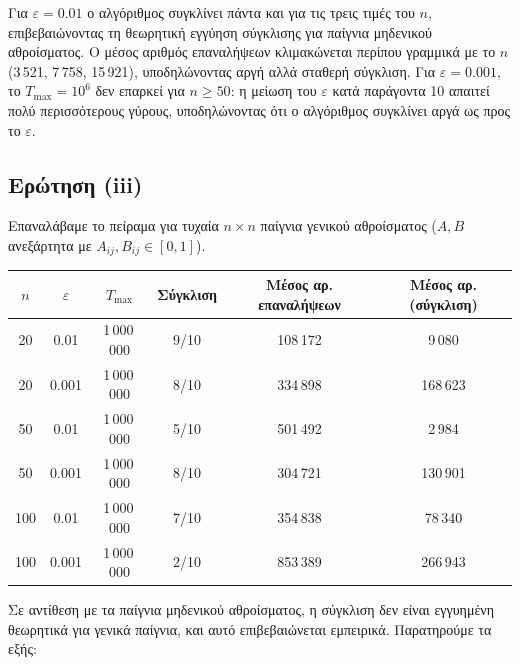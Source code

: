 Για $\varepsilon = 0.01$ ο αλγόριθμος συγκλίνει πάντα και για τις τρεις τιμές
του $n$, επιβεβαιώνοντας τη θεωρητική εγγύηση σύγκλισης για παίγνια μηδενικού
αθροίσματος. Ο μέσος αριθμός επαναλήψεων κλιμακώνεται περίπου γραμμικά με το
$n$ (3\,521, 7\,758, 15\,921), υποδηλώνοντας αργή αλλά σταθερή σύγκλιση. Για
$\varepsilon = 0.001$, το $T_{\max} = 10^6$ δεν επαρκεί για $n \geq 50$: η
μείωση του $\varepsilon$ κατά παράγοντα 10 απαιτεί πολύ περισσότερους γύρους,
υποδηλώνοντας ότι ο αλγόριθμος συγκλίνει αργά ως προς το $\varepsilon$.

\subsection{Ερώτηση (iii)}

Επαναλάβαμε το πείραμα για τυχαία $n \times n$ παίγνια γενικού αθροίσματος
($A, B$ ανεξάρτητα με $A_{ij}, B_{ij} \in [0,1]$).

\begin{center}
\begin{tabular}{cccccc}
    $n$ & $\varepsilon$ & $T_{\max}$ & Σύγκλιση & Μέσος αρ. επαναλήψεων & Μέσος αρ. (σύγκλιση) \\
    \hline
    20  & 0.01  & 1\,000\,000 & 9/10  & 108\,172 & 9\,080    \\
    20  & 0.001 & 1\,000\,000 & 8/10  & 334\,898 & 168\,623  \\
    50  & 0.01  & 1\,000\,000 & 5/10  & 501\,492 & 2\,984    \\
    50  & 0.001 & 1\,000\,000 & 8/10  & 304\,721 & 130\,901  \\
    100 & 0.01  & 1\,000\,000 & 7/10  & 354\,838 & 78\,340   \\
    100 & 0.001 & 1\,000\,000 & 2/10  & 853\,389 & 266\,943  \\
\end{tabular}
\end{center}

Σε αντίθεση με τα παίγνια μηδενικού αθροίσματος, η σύγκλιση δεν είναι
εγγυημένη θεωρητικά για γενικά παίγνια, και αυτό επιβεβαιώνεται εμπειρικά.
Παρατηρούμε τα εξής:

